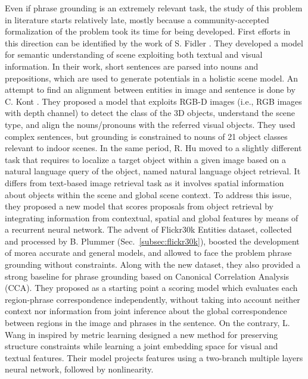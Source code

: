 Even if phrase grounding is an extremely relevant task, the study of
this problem in literature starts relatively late, mostly because a
community-accepted formalization of the problem took its time for
being developed. First efforts in this direction can be identified by
the work of S. Fidler \etal{} \cite{fidler2013sentence}. They
developed a model for semantic understanding of scene exploiting both
textual and visual information. In their work, short sentences are
parsed into nouns and prepositions, which are used to generate
potentials in a holistic scene model. An attempt to find an alignment
between entities in image and sentence is done by C. Kont \etal{}
\cite{kong2014you}. They proposed a model that exploits RGB-D images
(i.e., RGB images with depth channel) to detect the class of the 3D
objects, understand the scene type, and align the nouns/pronouns with
the referred visual objects. They used complex sentences, but
grounding is constrained to nouns of 21 object classes relevant to
indoor scenes. In the same period, R. Hu \etal{} \cite{hu2016natural}
moved to a slightly different task that requires to localize a target
object within a given image based on a natural language query of the
object, named natural language object retrieval. It differs from
text-based image retrieval task as it involves spatial information
about objects within the scene and global scene context. To address
this issue, they proposed a new model that scores proposals from
object retrieval by integrating information from contextual, spatial
and global features by means of a recurrent neural network. The advent
of Flickr30k Entities dataset, collected and processed by B. Plummer
\etal{} \cite{plummer2015flickr30k} (Sec.~\ref{subsec:flickr30k}),
boosted the development of morea accurate and general models, and
allowed to face the problem phrase grounding without constraints.
Along with the new dataset, they also provided a strong baseline for
phrase grounding based on Canonical Correlation Analysis (CCA). They
proposed as a starting point a scoring model which evaluates each
region-phrase correspondence independently, without taking into
account neither context nor information from joint inference about the
global correspondence between regions in the image and phrases in the
sentence. On the contrary, L. Wang \etal{} in \cite{wang2016learning}
inspired by metric learning designed a new method for preserving
structure constraints while learning a joint embedding space for
visual and textual features. Their model projects features using a
two-branch multiple layers neural network, followed by nonlinearity.
